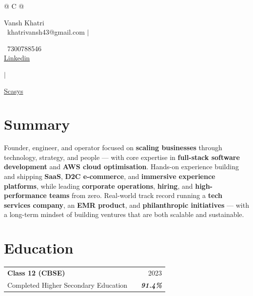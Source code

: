 \documentclass[a4paper,10pt]{article}
\begin{document}
\pagestyle{empty}




\begin{tabularx}{\linewidth}{@{} C @{}}

\color[HTML]{1C033C} \Huge{Vansh Khatri} \\[1pt]

\textcolor[HTML]{371e77}{{\faEnvelope\ khatrivansh43@gmail.com}} $|$

\textcolor[HTML]{371e77}{{\faMobile\ 7300788546}} \\[1pt]

\textcolor[HTML]{371e77}{\href{https://www.linkedin.com/in/vansh-khatri-3589b1282/}{\raisebox{-0.05\height}{\faLinkedin} Linkedin}}

$|$

\textcolor[HTML]{371e77}{\href{https://scasys.in}{\raisebox{-0.05\height}{\faBuilding} Scasys}}

\end{tabularx}




\section{Summary}

\textcolor[HTML]{1C033C}{

Founder, engineer, and operator focused on \textbf{scaling businesses} through technology, strategy, and people — with core expertise in \textbf{full-stack software development} and \textbf{AWS cloud optimisation}. Hands-on experience building and shipping \textbf{SaaS}, \textbf{D2C e-commerce}, and \textbf{immersive experience platforms}, while leading \textbf{corporate operations}, \textbf{hiring}, and \textbf{high-performance teams} from zero. Real-world track record running a \textbf{tech services company}, an \textbf{EMR product}, and \textbf{philanthropic initiatives} — with a long-term mindset of building ventures that are both scalable and sustainable.

}




\section{Education}

\begin{tabularx}{\linewidth}{ @{}l X r@{} }

\color[HTML]{1C033C} \textbf{Class 12 (CBSE)} & \hfill & \color[HTML]{371e77} 2023 \\

\color[HTML]{371e77} Completed Higher Secondary Education & \hfill & \color[HTML]{4B28A4} \textit{\textbf{91.4\%}} \\

\end{tabularx}
\end{document}
